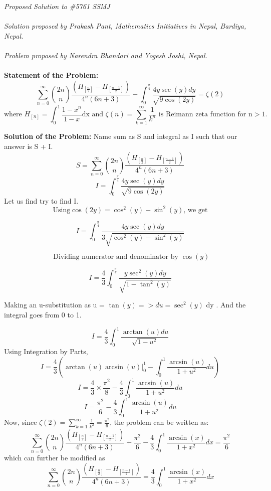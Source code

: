 \documentclass[12pt]{article}
\begin{document}
\textit{Proposed Solution to \#5761 SSMJ }\\ \\
\textit{Solution proposed by Prakash Pant, Mathematics Initiatives in Nepal, Bardiya, Nepal.}\\ \\
\textit{Problem proposed by Narendra Bhandari and Yogesh Joshi, Nepal.
} \\ \\
\textbf{Statement of the Problem:}
\[ \sum_{n=0}^{\infty} \binom{2n}{n} \frac{\left( H_{[\frac{n}{2}]} - H_{ [ \frac{n-1}{2}]} \right)} {4^n (6n+3)} + \int_0^{\frac{\pi}{4}} \frac{4 y \sec(y) dy}{\sqrt{ 9 \cos(2y)}} = \zeta{(2)}\] 
\[ \text{where } H_{[n]} = \int_0^1 \frac{1-x^n}{1-x} \text{dx and } \zeta(n) = \sum_{k=1}^{\infty} \frac{1}{k^n} \text{ is Reimann zeta function for n} > 1 .\]

\textbf{Solution of the Problem:}
Name sum as S and integral as I such that our answer is S + I. \\ 
\[S =  \sum_{n=0}^{\infty} \binom{2n}{n} \frac{\left( H_{[\frac{n}{2}]} - H_{ [ \frac{n-1}{2}]} \right)} {4^n (6n+3)} \]
\[ I =  \int_0^{\frac{\pi}{4}} \frac{4 y \sec(y) dy}{\sqrt{ 9 \cos(2y)}} \]  
Let us find try to find I. \\
\[ \text{ Using} \cos(2y)=\cos^2(y) - \sin^2(y)\text{, we get } \]


\[ I=  \int_0^{\frac{\pi}{4}} \frac{4 y \sec(y) dy}{3 \sqrt{ \cos^2(y) - \sin^2(y) }} \]  

\[ \text{ Dividing numerator and denominator by } \cos(y) \]
 
\[ I= \frac{4}{3} \int_0^{\frac{\pi}{4}}  \frac{ y \sec^2(y) dy}{ \sqrt{ 1 - \tan^2(y) }} \]  

 Making an u-substitution as u = $\tan(y) => du = \sec^2(y)$ dy
 . And the integral goes from 0 to 1. 
 
 \[ I= \frac{4}{3} \int_0^{1} \frac{ \arctan(u) du}{ \sqrt{ 1 - u^2}} \]    
Using Integration by Parts,
  \[ I= \frac{4}{3} \left(  \arctan(u) \arcsin(u) \Big|_0^1 -  \int_0^{1} \frac{\arcsin(u)}{1+u^2} du \right) \] 
 \[ I = \frac{4}{3} \times \frac{\pi^2}{8}  - \frac{4}{3} \int_0^{1} \frac{\arcsin(u)}{1+u^2} du \]
 \[ I = \frac{\pi^2}{6}  - \frac{4}{3} \int_0^{1} \frac{\arcsin(u)}{1+u^2} du \] 
Now, since $ \zeta(2) = \sum_{k=1}^{\infty} \frac{1}{k^2} = \frac{\pi^2}{6}$, the problem can be written as: 
 \[ \sum_{n=0}^{\infty} \binom{2n}{n} \frac{\left( H_{[\frac{n}{2}]} - H_{ [ \frac{n-1}{2}]} \right)} {4^n (6n+3)} + \frac{\pi^2}{6}  - \frac{4}{3} \int_0^{1} \frac{\arcsin(x)}{1+x^2} dx = \frac{\pi^2}{6}\]  
which can further be modified as 
  \[ \sum_{n=0}^{\infty} \binom{2n}{n} \frac{\left( H_{[\frac{n}{2}]} - H_{ [ \frac{n-1}{2}]} \right)} {4^n (6n+3)} = \frac{4}{3} \int_0^{1} \frac{\arcsin(x)}{1+x^2} dx\]  
 
\end{document}
